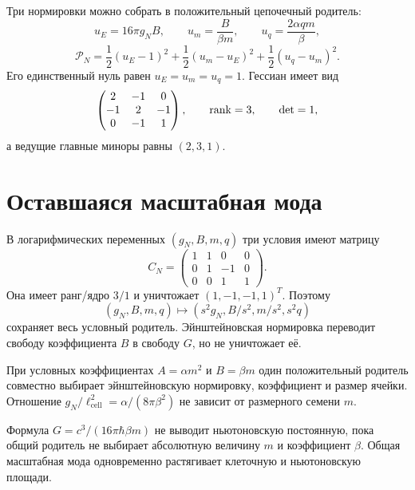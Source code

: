 Три нормировки можно собрать в положительный цепочечный родитель:
\begin{equation}
 u_E=16\pi g_NB,
 \qquad u_m=\frac{B}{\beta m},
 \qquad u_q=\frac{2\alpha qm}{\beta},
\end{equation}
\begin{equation}
 \mathcal P_N
 =\frac12(u_E-1)^2+\frac12(u_m-u_E)^2+\frac12(u_q-u_m)^2.
 \label{eq:v10-newton-common-parent}
\end{equation}
Его единственный нуль равен $u_E=u_m=u_q=1$. Гессиан имеет вид
\begin{equation}
 \begin{pmatrix}2&-1&0\\-1&2&-1\\0&-1&1\end{pmatrix},
 \qquad \operatorname{rank}=3,
 \qquad \det=1,
\end{equation}
а ведущие главные миноры равны $(2,3,1)$.

\section{Оставшаяся масштабная мода}

В логарифмических переменных $(g_N,B,m,q)$ три условия имеют матрицу
\begin{equation}
 C_N=
 \begin{pmatrix}
 1&1&0&0\\
 0&1&-1&0\\
 0&0&1&1
 \end{pmatrix}.
 \label{eq:v10-newton-scale-map}
\end{equation}
Она имеет ранг/ядро $3/1$ и уничтожает $(1,-1,-1,1)^T$. Поэтому
\begin{equation}
 (g_N,B,m,q)\mapsto(s^2g_N,B/s^2,m/s^2,s^2q)
\end{equation}
сохраняет весь условный родитель. Эйнштейновская нормировка переводит
свободу коэффициента $B$ в свободу $G$, но не уничтожает её.

\begin{theorem}
При условных коэффициентах $A=\alpha m^2$ и $B=\beta m$ один положительный
родитель совместно выбирает эйнштейновскую нормировку, коэффициент и размер
ячейки. Отношение $g_N/\ell_{\mathrm{cell}}^2=\alpha/(8\pi\beta^2)$ не зависит
от размерного семени $m$.
\end{theorem}

\begin{nogocriterion}
Формула $G=c^3/(16\pi\hbar\beta m)$ не выводит ньютоновскую постоянную,
пока общий родитель не выбирает абсолютную величину $m$ и коэффициент
$\beta$. Общая масштабная мода одновременно растягивает клеточную и
ньютоновскую площади.
\end{nogocriterion}

